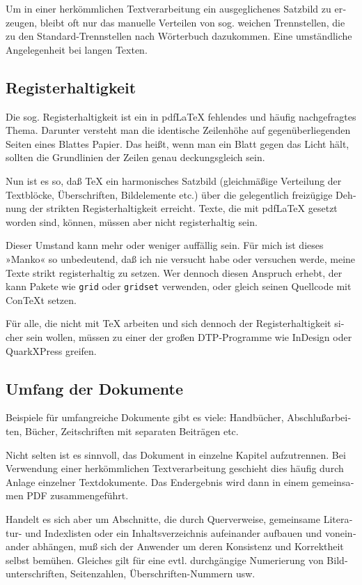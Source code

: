 \documentclass[11pt,a4paper,ngerman,french,DIV=8]{scrartcl}
\begin{document}
\begin{otherlanguage}{ngerman}
Um in einer herkömmlichen Textverarbeitung ein ausgeglichenes Satzbild zu erzeugen, bleibt oft nur das manuelle Verteilen von sog. weichen Trennstellen, die zu den Standard-Trennstellen nach Wörterbuch dazukommen. Eine umständliche Angelegenheit bei langen Texten.

\subsection{Registerhaltigkeit}

Die sog. Registerhaltigkeit ist ein in pdf\LaTeX{} fehlendes und häufig nachgefragtes Thema. Darunter versteht man die identische Zeilenhöhe auf gegenüberliegenden Seiten eines Blattes Papier. Das heißt, wenn man ein Blatt gegen das Licht hält, sollten die Grundlinien der Zeilen genau deckungsgleich sein.

Nun ist es so, daß \TeX{} ein harmonisches Satzbild (gleichmäßige Verteilung der Textblöcke, Überschriften, Bildelemente etc.) über die gelegentlich freizügige Dehnung der strikten Registerhaltigkeit erreicht. Texte, die mit pdf\LaTeX{} gesetzt worden sind, können, müssen aber nicht registerhaltig sein.

Dieser Umstand kann mehr oder weniger auffällig sein. Für mich ist dieses »Manko« so unbedeutend, daß ich nie versucht habe oder versuchen werde, meine Texte strikt registerhaltig zu setzen. Wer dennoch diesen Anspruch erhebt, der kann Pakete wie \texttt{grid} oder \texttt{gridset} verwenden, oder gleich seinen Quellcode mit Con\TeX{}t setzen.

Für alle, die nicht mit \TeX{} arbeiten und sich dennoch der Registerhaltigkeit sicher sein wollen, müssen zu einer der großen DTP-Programme wie InDesign oder QuarkXPress greifen.

\subsection{Umfang der Dokumente}

Beispiele für umfangreiche Dokumente gibt es viele: Handbücher, Abschlußarbeiten, Bücher, Zeitschriften mit separaten Beiträgen etc.

Nicht selten ist es sinnvoll, das Dokument in einzelne Kapitel aufzutrennen. Bei Verwendung einer herkömmlichen Textverarbeitung geschieht dies häufig durch Anlage einzelner Textdokumente. Das Endergebnis wird dann in einem gemeinsamen PDF zusammengeführt.

Handelt es sich aber um Abschnitte, die durch Querverweise, gemeinsame Literatur- und Indexlisten oder ein Inhaltsverzeichnis aufeinander aufbauen und voneinander abhängen, muß sich der Anwender um deren Konsistenz und Korrektheit selbst bemühen. Gleiches gilt für eine evtl. durchgängige Numerierung von Bildunterschriften, Seitenzahlen, Überschriften-Nummern usw.


\end{otherlanguage}
\end{document}

